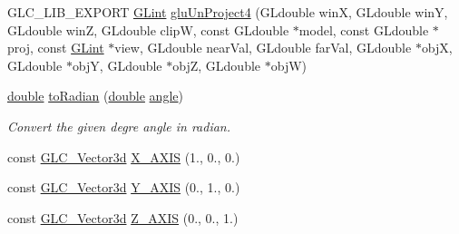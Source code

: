 \begin{DoxyCompactItemize}
\item 
G\-L\-C\-\_\-\-L\-I\-B\-\_\-\-E\-X\-P\-O\-R\-T \hyperlink{glext_8h_aacf898e4ecb940565baac883dc587ff0}{G\-Lint} \hyperlink{namespaceglc_a7d02c8e7e1ec5875b6a01a3b0a46c5c7}{glu\-Un\-Project4} (G\-Ldouble win\-X, G\-Ldouble win\-Y, G\-Ldouble win\-Z, G\-Ldouble clip\-W, const G\-Ldouble $\ast$model, const G\-Ldouble $\ast$proj, const \hyperlink{glext_8h_aacf898e4ecb940565baac883dc587ff0}{G\-Lint} $\ast$view, G\-Ldouble near\-Val, G\-Ldouble far\-Val, G\-Ldouble $\ast$obj\-X, G\-Ldouble $\ast$obj\-Y, G\-Ldouble $\ast$obj\-Z, G\-Ldouble $\ast$obj\-W)
\item 
\hyperlink{_super_l_u_support_8h_a8956b2b9f49bf918deed98379d159ca7}{double} \hyperlink{namespaceglc_ae39534d955d5365f5a23ccfe2394fee4}{to\-Radian} (\hyperlink{_super_l_u_support_8h_a8956b2b9f49bf918deed98379d159ca7}{double} \hyperlink{glext_8h_a9e06c1f76a20fed54ca742cd25cb02c4}{angle})
\begin{DoxyCompactList}\small\item\em Convert the given degre angle in radian. \end{DoxyCompactList}\item 
const \hyperlink{class_g_l_c___vector3d}{G\-L\-C\-\_\-\-Vector3d} \hyperlink{namespaceglc_a6a4ac8d7ab9da1d4f791c183d3bb5605}{X\-\_\-\-A\-X\-I\-S} (1., 0., 0.)
\item 
const \hyperlink{class_g_l_c___vector3d}{G\-L\-C\-\_\-\-Vector3d} \hyperlink{namespaceglc_abb5d079a0ce7049a4394e79a2d16f982}{Y\-\_\-\-A\-X\-I\-S} (0., 1., 0.)
\item 
const \hyperlink{class_g_l_c___vector3d}{G\-L\-C\-\_\-\-Vector3d} \hyperlink{namespaceglc_ab62ca4ac3c25a6847c6cbc7f079a1157}{Z\-\_\-\-A\-X\-I\-S} (0., 0., 1.)
\end{DoxyCompactItemize}
